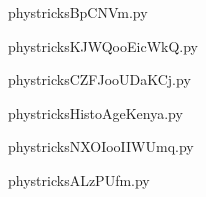 
    \newcommand{\CaptionFigBpCNVm}{<+Type your caption here+>}
    \begin{center}
        
    \end{center}
    phystricksBpCNVm.py

    

    \clearpage
    


    \newcommand{\CaptionFigKJWQooEicWkQ}{<+Type your caption here+>}
    \begin{center}
        
    \end{center}
    phystricksKJWQooEicWkQ.py

    

    \clearpage
    


    \newcommand{\CaptionFigCZFJooUDaKCj}{<+Type your caption here+>}
    \begin{center}
        
    \end{center}
    phystricksCZFJooUDaKCj.py

    

    \clearpage
    


    \newcommand{\CaptionFigHistoAgeKenya}{<+Type your caption here+>}
    \begin{center}
        
    \end{center}
    phystricksHistoAgeKenya.py

    

    \clearpage
    


    \newcommand{\CaptionFigNXOIooIIWUmq}{<+Type your caption here+>}
    \begin{center}
        
    \end{center}
    phystricksNXOIooIIWUmq.py

    

    \clearpage
    


    \newcommand{\CaptionFigALzPUfm}{<+Type your caption here+>}
    \begin{center}
        
    \end{center}
    phystricksALzPUfm.py

